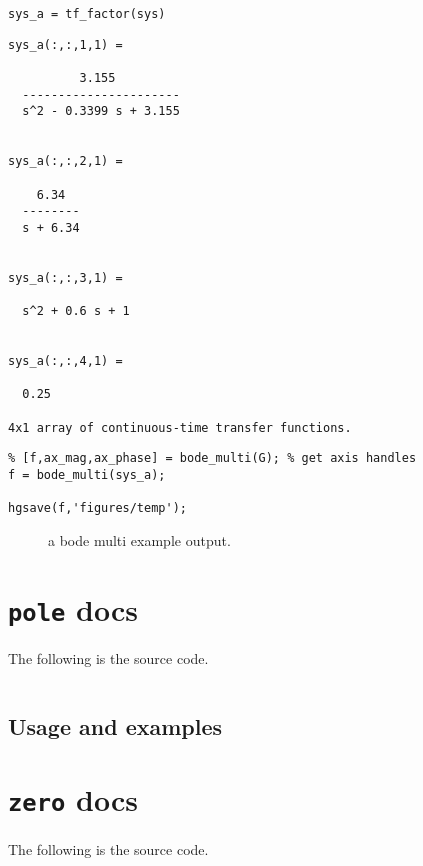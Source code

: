 \begin{verbatim}
sys_a = tf_factor(sys)
\end{verbatim}

\begin{verbatim}
sys_a(:,:,1,1) =
 
          3.155
  ----------------------
  s^2 - 0.3399 s + 3.155
 

sys_a(:,:,2,1) =
 
    6.34
  --------
  s + 6.34
 

sys_a(:,:,3,1) =
 
  s^2 + 0.6 s + 1
 

sys_a(:,:,4,1) =
 
  0.25
 
4x1 array of continuous-time transfer functions.
\end{verbatim}

\begin{verbatim}
% [f,ax_mag,ax_phase] = bode_multi(G); % get axis handles
f = bode_multi(sys_a);

hgsave(f,'figures/temp');
\end{verbatim}

\begin{figure}
\centering

\caption{a bode multi example output.}
\label{fig:bode_multi_docs}
\end{figure}

\hypertarget{pole-docs}{%
\section{\texorpdfstring{\texttt{pole}
docs}{ docs}}\label{pole-docs}}

The following is the source code.

\inputminted{matlab}{../rico/pole.m}

\hypertarget{usage-and-examples-2}{%
\subsection{Usage and examples}\label{usage-and-examples-2}}

\hypertarget{zero-docs}{%
\section{\texorpdfstring{\texttt{zero}
docs}{ docs}}\label{zero-docs}}

The following is the source code.

